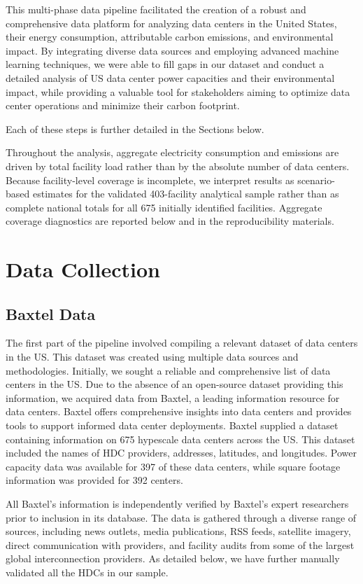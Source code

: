 \documentclass[12pt]{article}
\begin{document}
This multi-phase data pipeline facilitated the creation of a robust and comprehensive data platform for analyzing data centers in the United States, their energy consumption, attributable carbon emissions, and environmental impact. By integrating diverse data sources and employing advanced machine learning techniques, we were able to fill gaps in our dataset and conduct a detailed analysis of US data center power capacities and their environmental impact, while providing a valuable tool for stakeholders aiming to optimize data center operations and minimize their carbon footprint. 

Each of these steps is further detailed in the Sections below.

Throughout the analysis, aggregate electricity consumption and emissions are driven by total facility load rather than by the absolute number of data centers. Because facility-level coverage is incomplete, we interpret results as scenario-based estimates for the validated 403-facility analytical sample rather than as complete national totals for all 675 initially identified facilities. Aggregate coverage diagnostics are reported below and in the reproducibility materials.


\section{Data Collection}\label{sm:s1}

\subsection{Baxtel Data}

The first part of the pipeline involved compiling a relevant dataset of data centers in the US. This dataset was created using multiple data sources and methodologies. Initially, we sought a reliable and comprehensive list of data centers in the US. Due to the absence of an open-source dataset providing this information, we acquired data from Baxtel, a leading information resource for data centers. Baxtel offers comprehensive insights into data centers and provides tools to support informed data center deployments. Baxtel supplied a dataset containing information on 675  hypescale data centers across the US. This dataset included the names of HDC providers, addresses, latitudes, and longitudes. Power capacity data was available for 397 of these data centers, while square footage information was provided for 392 centers. 

All Baxtel's information is independently verified by Baxtel's expert researchers prior to inclusion in its database. The data is gathered through a diverse range of sources, including news outlets, media publications, RSS feeds, satellite imagery, direct communication with providers, and facility audits from some of the largest global interconnection providers. As detailed below, we have further manually validated all the HDCs in our sample.
\end{document}
